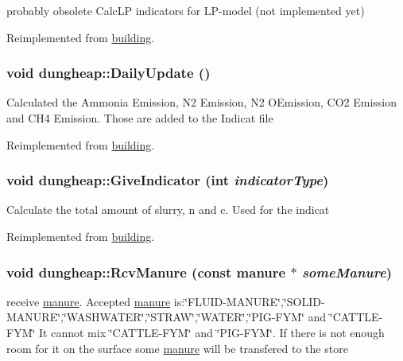 probably obsolete CalcLP indicators for LP-\/model (not implemented yet) 

Reimplemented from \hyperlink{classbuilding_af1f27cbf72295547af61edc9e02a7e61}{building}.\hypertarget{classdungheap_ab901a0eba5e5cb9164042bbfad350435}{
\subsubsection[{DailyUpdate}]{\setlength{\rightskip}{0pt plus 5cm}void dungheap::DailyUpdate ()}}
\label{classdungheap_ab901a0eba5e5cb9164042bbfad350435}
Calculated the Ammonia Emission, N2 Emission, N2 OEmission, CO2 Emission and CH4 Emission. Those are added to the Indicat file 

Reimplemented from \hyperlink{classbuilding_a584ba300427d2a648f478b68065b7a18}{building}.\hypertarget{classdungheap_ac8c6b260da69dabe3a0019f9a5d8d499}{
\subsubsection[{GiveIndicator}]{\setlength{\rightskip}{0pt plus 5cm}void dungheap::GiveIndicator (int {\em indicatorType})}}
\label{classdungheap_ac8c6b260da69dabe3a0019f9a5d8d499}
Calculate the total amount of slurry, n and c. Used for the indicat 

Reimplemented from \hyperlink{classbuilding_ae0e21d6fc26978c65a980676ddf4fcdf}{building}.\hypertarget{classdungheap_a852054912c04f101c0a3310e80d6d53b}{
\subsubsection[{RcvManure}]{\setlength{\rightskip}{0pt plus 5cm}void dungheap::RcvManure (const {\bf manure} $\ast$ {\em someManure})}}
\label{classdungheap_a852054912c04f101c0a3310e80d6d53b}
receive \hyperlink{classmanure}{manure}. Accepted \hyperlink{classmanure}{manure} is:\char`\"{}FLUID-\/MANURE\char`\"{},\char`\"{}SOLID-\/MANURE\char`\"{},\char`\"{}WASHWATER\char`\"{},\char`\"{}STRAW\char`\"{},\char`\"{}WATER\char`\"{},\char`\"{}PIG-\/FYM\char`\"{} and \char`\"{}CATTLE-\/FYM\char`\"{} It cannot mix \char`\"{}CATTLE-\/FYM\char`\"{} and \char`\"{}PIG-\/FYM\char`\"{}. If there is not enough room for it on the surface some \hyperlink{classmanure}{manure} will be transfered to the store 

